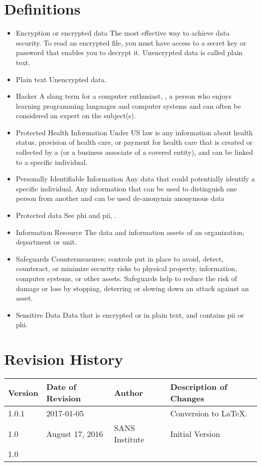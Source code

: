 \section{Definitions}\label{G:DBRP:D}
\begin{itemize}
\item{Encryption or encrypted data}
The most effective way to achieve data security.  
To read an encrypted file, you must have access to a secret key or password that enables you to decrypt it.  
Unencrypted data is called plain text.
\item{Plain text}
Unencrypted data.
\item{Hacker}
A slang term for a computer enthusiast, \ie{}, a person who enjoys learning programming languages and computer systems and can often be considered an expert on the subject(s).
\item{Protected Health Information}\label{G:DBRP:D:PHI}
Under US law is any information about health status, provision of health care, or payment for health care that is created or collected by a  (or a business associate of a covered entity), and can be linked to a specific individual.
\item{Personally Identifiable Information}\label{G:DBRP:D:PII}
Any data that could potentially identify a specific individual.  
Any information that can be used to distinguish one person from another and can be used  de-anonymiz anonymous data
\item{Protected data}
See \gls{phi} and \gls{pii}, .
\item{Information Resource}
The data and information assets of an organization, department\oxford{} or unit.
\item{Safeguards}
Countermeasures; controls put in place to avoid, detect, counteract, or minimize security risks to physical property, information, computer systems, or other assets.  
Safeguards help to reduce the risk of damage or loss by stopping, deterring\oxford{} or slowing down an attack against an asset.
\item{Sensitive Data}
Data that is encrypted or in plain text, and contains \gls{pii} or \gls{phi}.  
\end{itemize}

\section{Revision History}
\begin{tabular}{|p{0.50in}|p{1.25in}|p{1.25in}|p{2.50in}|}
\hline
	Version&
	Date of Revision&
	Author&
	Description of Changes\\
\hline
	1.0.1&
	2017-01-05&
	\xio{}&
	Conversion to \LaTeX{}.\\
\hline
	1.0&
	August 17, 2016&
	SANS Institute&
	Initial Version\\
\hline
	1.0&
	&
	&
	\\
\hline
\end{tabular}